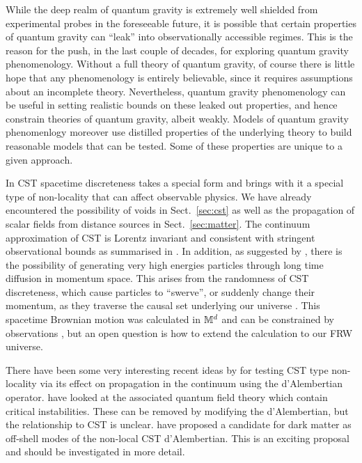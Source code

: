 While the deep realm of quantum gravity is extremely well shielded from experimental probes in the foreseeable future, it is possible that certain
{properties}  of quantum gravity  can ``leak'' into observationally accessible regimes. This is the reason for the push, in the last
couple of decades, for exploring quantum gravity phenomenology. Without a full theory of quantum gravity, of course
there is little hope that any phenomenology is entirely believable, since it requires assumptions about an
incomplete theory. Nevertheless, quantum gravity phenomenology can be  useful  in setting realistic bounds on
these leaked out properties, and hence constrain theories of quantum gravity, albeit weakly.  Models of quantum gravity
phenomenlogy moreover use distilled properties of the underlying theory to build reasonable
models that can be tested. Some of these properties are unique to a given approach.

In CST spacetime discreteness takes
a special form and brings with it a special type of  non-locality that can  affect observable physics. We have already
encountered the possibility of voids in Sect.~\ref{sec:cst} as well as the propagation of scalar fields from distance
sources in Sect.~\ref{sec:matter}. 
The continuum approximation of CST  is Lorentz invariant and consistent with stringent observational bounds as
summarised in \cite{li}.
In
addition, as suggested by \cite{swerves}, there is the possibility of generating very high energies particles through long time diffusion in
momentum space. This arises  from the randomness of CST  discreteness, which cause particles to ``swerve'',  or suddenly
change their momentum, 
as they traverse the causal set underlying our universe \citep{swervestwo,faypolarisation}.
This spacetime
Brownian motion was calculated in $\mathbb M^d$ and  can be constrained by observations \citep{swerveconstraint}, but an
open question is how to extend the calculation  to our FRW universe. 

There have been some very interesting recent ideas by \cite{nonlocalqftfour} for testing CST type  non-locality  via its
effect on propagation in the continuum using the d'Alembertian operator. \cite{nonlocalfive}  have looked at the
associated quantum field theory which contain critical instabilities. These can be removed by modifying the
d'Alembertian, but the relationship to CST is unclear.  \cite{darkmatter}  have proposed a candidate for dark
matter as off-shell modes of the non-local CST  d'Alembertian. This is an exciting proposal and should be investigated
in more detail. 

